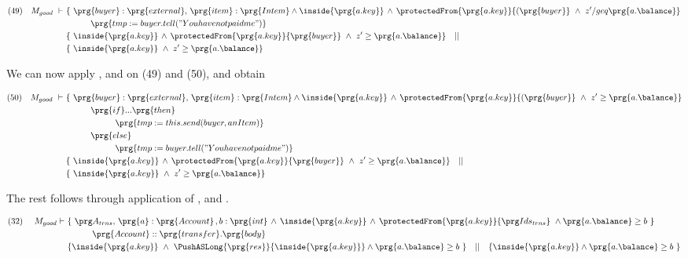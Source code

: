 \begin{proofO}
 \small
\begin{align*}
\text{(49)} \ \ \ M_{good}\  \vdash \ & \{ \ \prg{buyer}:\prg{external},\, \prg{item}:\prg{Intem} \wedge {\inside{\prg{a.key}}} \, \wedge\, 
\protectedFrom {\prg{a.key}} {(\prg{buyer}}  \  \wedge\ z'/geq  \prg{a.\balance}  \} \\
		  		& \SPT  \prg{tmp:=buyer.tell("You have not paid me")}\ \\  
		  		& \{ \ \inside{\prg{a.key}} \, \wedge\, 
\protectedFrom {\prg{a.key}} {\prg{buyer}} \ \wedge\ z'\geq \prg{a.\balance}  \} \ \ \  || \ \ \  \\
		  		&   \{ \   {\inside{\prg{a.key}}}\  \wedge\ z'\geq  \prg{a.\balance}  \}
\end{align*}
\normalsize 

We can now apply  {\sc{[If\_Rule}}, and {\sc{[Conseq}} on (49) and (50),  and obtain

 \small
\begin{align*}
\text{(50)} \ \ \ M_{good}\  \vdash \ & \{ \ \prg{buyer}:\prg{external},\, \prg{item}:\prg{Intem} \wedge {\inside{\prg{a.key}}} \, \wedge\, 
\protectedFrom {\prg{a.key}} {(\prg{buyer}}  \  \wedge\ z'\geq  \prg{a.\balance}  \} \\
		  		& \SPT  \prg{if} ... \prg{then}\\
				& \SPT \SPT  \prg{tmp:=this.send(buyer,anItem)}\ \\  
				& \SPT  \prg{else}\\
				& \SPT \SPT  \prg{tmp:=buyer.tell("You have not paid me")}\ \\  
		  		& \{ \ \inside{\prg{a.key}} \, \wedge\, 
\protectedFrom {\prg{a.key}} {\prg{buyer}} \ \wedge\ z'\geq \prg{a.\balance}  \} \ \ \  || \ \ \  \\
		  		&   \{ \   {\inside{\prg{a.key}}}\  \wedge\ z'\geq  \prg{a.\balance}  \}
\end{align*}
\normalsize 

The rest follows through application of {\sc{[Prot\_Int}}, and {\sc{[Seq]}}.



\end{proofO}

\begin{lemma}
\label{l:transfer:sat:S3}
 \small
 \begin{align*}
\text{(32)}  \ \ \ \ M_{good} \vdash \ 
		&	\{  \ \Alocalstr, \, \prg{a}:\prg{Account}\, , b:\prg{int} \, \wedge\,  {\inside{\prg{a.key}}} \, \wedge \, \protectedFrom {\prg{a.key}} {\Idstr}  \ \wedge \prg{a.\balance}\geq b \  \} \\
		& \SPT \prg{Account}::\prg{transfer}.\prg{body}\ \\  
		& \{ {\inside{\prg{a.key}}}\ \wedge\ {\PushASLong {\prg{res}} {\inside{\prg{a.key}}} } \wedge \prg{a.\balance}\geq b \  \} \ \ \  || \ \ \ 
		   \{ {\inside{\prg{a.key}}} \wedge \prg{a.\balance}\geq b \  \}
\end{align*}
\normalsize


\end{lemma}

